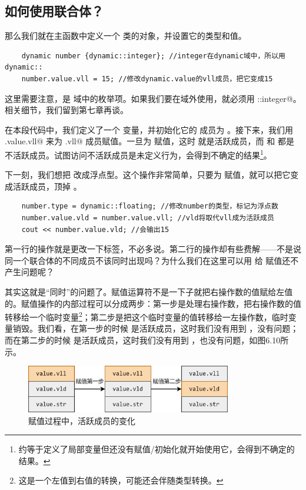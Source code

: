 \subsection*{如何使用联合体？}
那么我们就在主函数中定义一个 \lstinline@dynamic@ 类的对象，并设置它的类型和值。
\begin{lstlisting}
    dynamic number {dynamic::integer}; //integer在dynamic域中，所以用dynamic::
    number.value.vll = 15; //修改dynamic.value的vll成员，把它变成15
\end{lstlisting}
这里需要注意，\lstinline@integer@ 是 \lstinline@dynamic@ 域中的枚举项。如果我们要在域外使用，就必须用 \lstinline@dynamic::integer@。相关细节，我们留到第七章再谈。\par
在本段代码中，我们定义了一个 \lstinline@number@ 变量，并初始化它的 \lstinline@type@ 成员为 \lstinline@integer@。接下来，我们用 \lstinline@number.value.vll@ 来为 \lstinline@value.vll@ 成员赋值。一旦为 \lstinline@vll@ 赋值，这时 \lstinline@vll@ 就是活跃成员，而 \lstinline@vld@ 和 \lstinline@str@ 都是不活跃成员。试图访问不活跃成员是未定义行为，会得到不确定的结果\footnote{约等于定义了局部变量但还没有赋值/初始化就开始使用它，会得到不确定的结果。}。\par
下一刻，我们想把 \lstinline@number@ 改成浮点型。这个操作非常简单，只要为 \lstinline@vld@ 赋值，就可以把它变成活跃成员，顶掉 \lstinline@vll@。\par
\begin{lstlisting}
    number.type = dynamic::floating; //修改number的类型，标记为浮点数
    number.value.vld = number.value.vll; //vld将取代vll成为活跃成员
    cout << number.value.vld; //会输出15
\end{lstlisting}
第一行的操作就是更改一下标签，不必多说。第二行的操作却有些费解——不是说同一个联合体的不同成员不该同时出现吗？为什么我们在这里可以用 \lstinline@vll@ 给 \lstinline@vld@ 赋值还不产生问题呢？\par
其实这就是``同时''的问题了。赋值运算符不是一下子就把右操作数的值赋给左值的。赋值操作的内部过程可以分成两步：第一步是处理右操作数，把右操作数的值转移给一个临时变量\footnote{这是一个左值到右值的转换，可能还会伴随类型转换。}；第二步是把这个临时变量的值转移给一左操作数，临时变量销毁。我们看，在第一步的时候 \lstinline@vll@ 是活跃成员，这时我们没有用到 \lstinline@vld@，没有问题；而在第二步的时候 \lstinline@vld@ 是活跃成员，这时我们没有用到 \lstinline@vll@，也没有问题，如图6.10所示。\par
\begin{figure}[htbp]
    \centering
    \includegraphics[width=0.8\textwidth]{../images/generalized_parts/06_process_of_assignment_to_union_300.png}
    \caption{赋值过程中，活跃成员的变化}
\end{figure}
